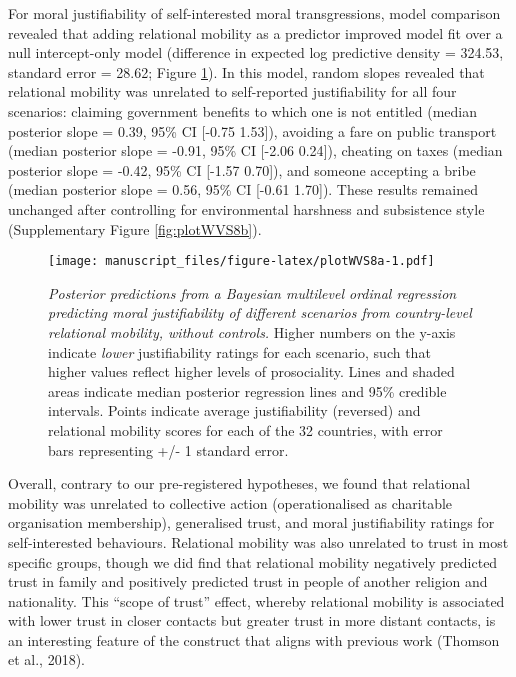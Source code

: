 \documentclass[
  man,floatsintext]{apa6}
\begin{document}
For moral justifiability of self-interested moral transgressions, model comparison revealed that adding relational mobility as a predictor improved model fit over a null intercept-only model (difference in expected log predictive density = 324.53, standard error = 28.62; Figure \ref{fig:plotWVS8a}). In this model, random slopes revealed that relational mobility was unrelated to self-reported justifiability for all four scenarios: claiming government benefits to which one is not entitled (median posterior slope = 0.39, 95\% CI {[}-0.75 1.53{]}), avoiding a fare on public transport (median posterior slope = -0.91, 95\% CI {[}-2.06 0.24{]}), cheating on taxes (median posterior slope = -0.42, 95\% CI {[}-1.57 0.70{]}), and someone accepting a bribe (median posterior slope = 0.56, 95\% CI {[}-0.61 1.70{]}). These results remained unchanged after controlling for environmental harshness and subsistence style (Supplementary Figure \ref{fig:plotWVS8b}).



\begin{figure}
\centering
\texttt{[image: manuscript\_files/figure-latex/plotWVS8a-1.pdf]}
\caption{\label{fig:plotWVS8a}\emph{Posterior predictions from a Bayesian multilevel ordinal regression predicting moral justifiability of different scenarios from country-level relational mobility, without controls.} Higher numbers on the y-axis indicate \emph{lower} justifiability ratings for each scenario, such that higher values reflect higher levels of prosociality. Lines and shaded areas indicate median posterior regression lines and 95\% credible intervals. Points indicate average justifiability (reversed) and relational mobility scores for each of the 32 countries, with error bars representing +/- 1 standard error.}
\end{figure}

Overall, contrary to our pre-registered hypotheses, we found that relational mobility was unrelated to collective action (operationalised as charitable organisation membership), generalised trust, and moral justifiability ratings for self-interested behaviours. Relational mobility was also unrelated to trust in most specific groups, though we did find that relational mobility negatively predicted trust in family and positively predicted trust in people of another religion and nationality. This ``scope of trust'' effect, whereby relational mobility is associated with lower trust in closer contacts but greater trust in more distant contacts, is an interesting feature of the construct that aligns with previous work (Thomson et al., 2018).
\end{document}
